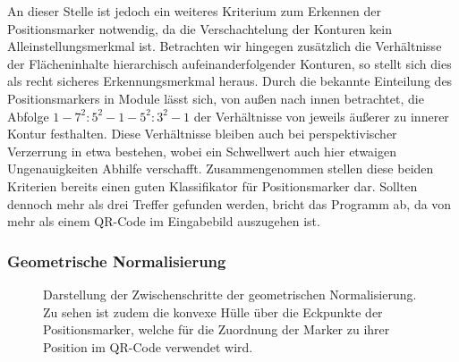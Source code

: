 \documentclass[a4paper, oneside, 12pt]{article}
\begin{document}
An dieser Stelle ist jedoch ein weiteres Kriterium zum Erkennen der Positionsmarker notwendig, da die Verschachtelung der Konturen kein Alleinstellungsmerkmal ist.
Betrachten wir hingegen zusätzlich die Verhältnisse der Flächeninhalte hierarchisch aufeinanderfolgender Konturen, so stellt sich dies als recht sicheres Erkennungsmerkmal heraus. Durch die bekannte Einteilung des Positionsmarkers in Module lässt sich, von außen nach innen betrachtet, die Abfolge $1 - 7^2:5^2 - 1 - 5^2:3^2 - 1$ der Verhältnisse von jeweils äußerer zu innerer Kontur festhalten.
Diese Verhältnisse bleiben auch bei perspektivischer Verzerrung in etwa bestehen, wobei ein Schwellwert auch hier etwaigen Ungenauigkeiten Abhilfe verschafft.
Zusammengenommen stellen diese beiden Kriterien bereits einen guten Klassifikator für Positionsmarker dar. Sollten dennoch mehr als drei Treffer gefunden werden, bricht das Programm ab, da von mehr als einem QR-Code im Eingabebild auszugehen ist.

\subsubsection{Geometrische Normalisierung}

\begin{figure}[t]
	\begin{center}
	\end{center}
	\caption{Darstellung der Zwischenschritte der geometrischen Normalisierung. Zu sehen ist zudem die konvexe Hülle über die Eckpunkte der Positionsmarker, welche für die Zuordnung der Marker zu ihrer Position im QR-Code verwendet wird.}
	\label{fig:geometrie}
\end{figure}
\end{document}
